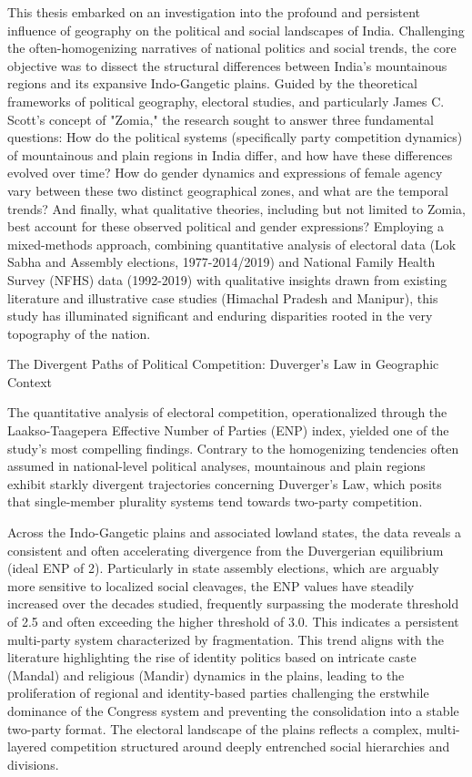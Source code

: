 

This thesis embarked on an investigation into the profound and persistent influence of geography on the political and social landscapes of India. Challenging the often-homogenizing narratives of national politics and social trends, the core objective was to dissect the structural differences between India's mountainous regions and its expansive Indo-Gangetic plains. Guided by the theoretical frameworks of political geography, electoral studies, and particularly James C. Scott's concept of "Zomia," the research sought to answer three fundamental questions: How do the political systems (specifically party competition dynamics) of mountainous and plain regions in India differ, and how have these differences evolved over time? How do gender dynamics and expressions of female agency vary between these two distinct geographical zones, and what are the temporal trends? And finally, what qualitative theories, including but not limited to Zomia, best account for these observed political and gender expressions? Employing a mixed-methods approach, combining quantitative analysis of electoral data (Lok Sabha and Assembly elections, 1977-2014/2019) and National Family Health Survey (NFHS) data (1992-2019) with qualitative insights drawn from existing literature and illustrative case studies (Himachal Pradesh and Manipur), this study has illuminated significant and enduring disparities rooted in the very topography of the nation.

The Divergent Paths of Political Competition: Duverger's Law in Geographic Context

The quantitative analysis of electoral competition, operationalized through the Laakso-Taagepera Effective Number of Parties (ENP) index, yielded one of the study's most compelling findings. Contrary to the homogenizing tendencies often assumed in national-level political analyses, mountainous and plain regions exhibit starkly divergent trajectories concerning Duverger's Law, which posits that single-member plurality systems tend towards two-party competition.

Across the Indo-Gangetic plains and associated lowland states, the data reveals a consistent and often accelerating divergence from the Duvergerian equilibrium (ideal ENP of 2). Particularly in state assembly elections, which are arguably more sensitive to localized social cleavages, the ENP values have steadily increased over the decades studied, frequently surpassing the moderate threshold of 2.5 and often exceeding the higher threshold of 3.0. This indicates a persistent multi-party system characterized by fragmentation. This trend aligns with the literature highlighting the rise of identity politics based on intricate caste (Mandal) and religious (Mandir) dynamics in the plains, leading to the proliferation of regional and identity-based parties challenging the erstwhile dominance of the Congress system and preventing the consolidation into a stable two-party format. The electoral landscape of the plains reflects a complex, multi-layered competition structured around deeply entrenched social hierarchies and divisions.

